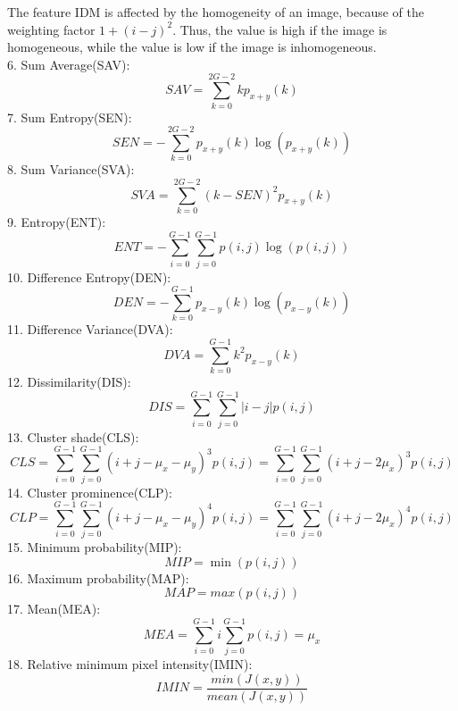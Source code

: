 The feature IDM is affected by the homogeneity of an image, because of the weighting factor $1+(i - j)^2$. Thus, the value is high if the image is homogeneous, while the value is low if the image is inhomogeneous.\\
6. Sum Average(SAV):
\begin{equation}
SAV = \sum_{k=0}^{2G-2}kp_{x+y}(k)
\end{equation}
7. Sum Entropy(SEN):
\begin{equation}
SEN = -\sum_{k=0}^{2G-2}p_{x+y}(k)\log(p_{x+y}(k))
\end{equation}
8. Sum Variance(SVA):
\begin{equation}
SVA = \sum_{k=0}^{2G-2}(k-SEN)^2p_{x+y}(k)
\end{equation}
9. Entropy(ENT):
\begin{equation}
ENT = - \sum_{i=0}^{G-1}\sum_{j=0}^{G-1}p(i,j)\log(p(i,j))
\end{equation}
10. Difference Entropy(DEN):
\begin{equation}
DEN = -\sum_{k=0}^{G-1}p_{x-y}(k)\log(p_{x-y}(k))
\end{equation}
11. Difference Variance(DVA):
\begin{equation}
DVA = \sum_{k=0}^{G-1}k^2p_{x-y}(k)
\end{equation}
12. Dissimilarity(DIS):
\begin{equation}
DIS = \sum_{i=0}^{G-1}\sum_{j=0}^{G-1}|i-j|p(i,j)
\end{equation}
13. Cluster shade(CLS):
\begin{equation}
CLS = \sum_{i=0}^{G-1}\sum_{j=0}^{G-1}(i+j-\mu_x-\mu_y)^3p(i,j) = \sum_{i=0}^{G-1}\sum_{j=0}^{G-1}(i+j-2\mu_x)^3p(i,j)
\end{equation}
14. Cluster prominence(CLP):
\begin{equation}
CLP=\sum_{i=0}^{G-1}\sum_{j=0}^{G-1}(i+j-\mu_x-\mu_y)^4p(i,j) = \sum_{i=0}^{G-1}\sum_{j=0}^{G-1}(i+j-2\mu_x)^4p(i,j)
\end{equation}
15. Minimum probability(MIP):
\begin{equation}
MIP = \min(p(i,j))
\end{equation}
16. Maximum probability(MAP):
\begin{equation}
MAP=max(p(i,j))
\end{equation}
17. Mean(MEA):
\begin{equation}
MEA = \sum_{i=0}^{G-1}i\sum_{j=0}^{G-1}p(i,j) = \mu_x
\end{equation}
18. Relative minimum pixel intensity(IMIN):
\begin{equation}
IMIN = \frac{min(J(x,y))}{mean(J(x,y))}
\end{equation}
